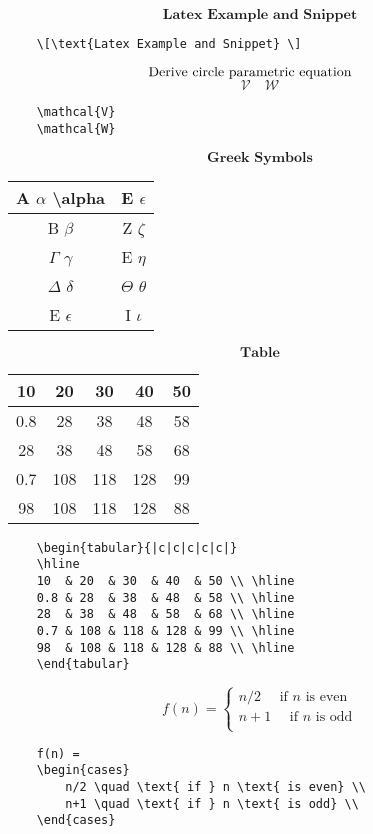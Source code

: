 \documentclass[10pt]{article}
\begin{document}
\[\textbf{Latex Example and Snippet} \]
\begin{verbatim}
    \[\text{Latex Example and Snippet} \]
\end{verbatim}

$\centerline{Derive circle parametric equation}$
\[ \mathcal{V} \quad \mathcal{W} \]
\begin{verbatim}
    \mathcal{V}
    \mathcal{W}
\end{verbatim}

\[\textbf{Greek Symbols} \]
\begin{tabular}{|c|c|}
\hline
A $\alpha$     \textbackslash alpha    & E $\epsilon$    \\ \hline
B $\beta$          & Z $\zeta$       \\ \hline
$\Gamma$ $\gamma$  & E $\eta$        \\ \hline
$\Delta$  $\delta$ & $\Theta$ $\theta$ \\ \hline
E $\epsilon$       & I $\iota$       \\ \hline
\end{tabular}


\[\textbf{Table} \]
\begin{tabular}{|c|c|c|c|c|}
\hline
10  & 20  & 30  & 40  & 50 \\ \hline
0.8 & 28  & 38  & 48  & 58 \\ \hline	
28  & 38  & 48  & 58  & 68 \\ \hline
0.7 & 108 & 118 & 128 & 99 \\ \hline
98  & 108 & 118 & 128 & 88 \\ \hline
\end{tabular}

\begin{verbatim}
    \begin{tabular}{|c|c|c|c|c|}
    \hline
    10  & 20  & 30  & 40  & 50 \\ \hline
    0.8 & 28  & 38  & 48  & 58 \\ \hline	
    28  & 38  & 48  & 58  & 68 \\ \hline
    0.7 & 108 & 118 & 128 & 99 \\ \hline
    98  & 108 & 118 & 128 & 88 \\ \hline
    \end{tabular}
\end{verbatim}

\[
    f(n) = 
    \begin{cases}
        n/2 \quad \text{ if } n \text{ is even} \\
        n+1 \quad \text{ if } n \text{ is odd} \\
    \end{cases}
\]
\begin{verbatim}
    f(n) = 
    \begin{cases}
        n/2 \quad \text{ if } n \text{ is even} \\
        n+1 \quad \text{ if } n \text{ is odd} \\
    \end{cases}
\end{verbatim}
\end{document}
